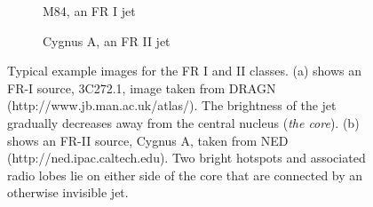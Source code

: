 \begin{figure}
    \begin{subfigure}[t]{0.365\textwidth}
        \caption{ M84, an FR I jet}
    \end{subfigure}
    \begin{subfigure}[t]{0.635\textwidth}
        \caption{Cygnus A, an FR II jet}
    \end{subfigure}
    
    \caption{Typical example images for the FR I and II classes. (a) shows an FR-I source, 3C272.1, image taken from DRAGN (http://www.jb.man.ac.uk/atlas/). The brightness of the jet gradually decreases away from the central nucleus (\textit{the core}). (b) shows an FR-II source, Cygnus A, taken from NED (http://ned.ipac.caltech.edu). Two bright hotspots and associated radio lobes lie on either side of the core that are connected by an otherwise invisible jet.\label{fig:FR_I_II} }
\end{figure}
